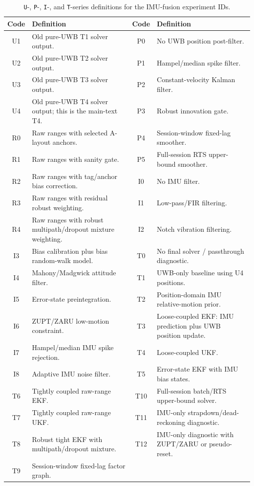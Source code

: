 \documentclass[11pt,a4paper]{article}
\begin{document}
\begin{table}[H]
\centering
\caption{\texttt{U}-, \texttt{P}-, \texttt{I}-, and \texttt{T}-series definitions for the IMU-fusion experiment IDs.}
\label{tab:app_imu_solver_codes}
\scriptsize
\begin{tabularx}{\textwidth}{c X c X}
\toprule
{Code} & {Definition} & {Code} & {Definition} \\
\midrule
U1 & Old pure-UWB T1 solver output. &
P0 & No UWB position post-filter. \\
U2 & Old pure-UWB T2 solver output. &
P1 & Hampel/median spike filter. \\
U3 & Old pure-UWB T3 solver output. &
P2 & Constant-velocity Kalman filter. \\
U4 & Old pure-UWB T4 solver output; this is the main-text T4. &
P3 & Robust innovation gate. \\
R0 & Raw ranges with selected A-layout anchors. &
P4 & Session-window fixed-lag smoother. \\
R1 & Raw ranges with sanity gate. &
P5 & Full-session RTS upper-bound smoother. \\
R2 & Raw ranges with tag/anchor bias correction. &
I0 & No IMU filter. \\
R3 & Raw ranges with residual robust weighting. &
I1 & Low-pass/FIR filtering. \\
R4 & Raw ranges with robust multipath/dropout mixture weighting. &
I2 & Notch vibration filtering. \\
I3 & Bias calibration plus bias random-walk model. &
T0 & No final solver / passthrough diagnostic. \\
I4 & Mahony/Madgwick attitude filter. &
T1 & UWB-only baseline using U4 positions. \\
I5 & Error-state preintegration. &
T2 & Position-domain IMU relative-motion prior. \\
I6 & ZUPT/ZARU low-motion constraint. &
T3 & Loose-coupled EKF: IMU prediction plus UWB position update. \\
I7 & Hampel/median IMU spike rejection. &
T4 & Loose-coupled UKF. \\
I8 & Adaptive IMU noise filter. &
T5 & Error-state EKF with IMU bias states. \\
T6 & Tightly coupled raw-range EKF. &
T10 & Full-session batch/RTS upper-bound solver. \\
T7 & Tightly coupled raw-range UKF. &
T11 & IMU-only strapdown/dead-reckoning diagnostic. \\
T8 & Robust tight EKF with multipath/dropout mixture. &
T12 & IMU-only diagnostic with ZUPT/ZARU or pseudo-reset. \\
T9 & Session-window fixed-lag factor graph. &
    &  \\
\bottomrule
\end{tabularx}
\end{table}
\end{document}
